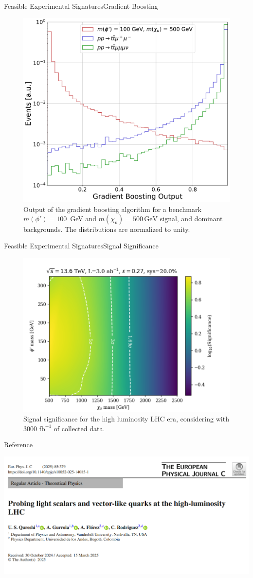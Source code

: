 \documentclass{../bredelebeamer}
\begin{document}
\begin{frame}{Feasible Experimental Signatures}{Gradient Boosting}
	\begin{figure}
	\centering
		\centering  \includegraphics[width=.6\linewidth]{XGB_output.pdf}
		\caption{Output of the gradient boosting algorithm for a benchmark $m(\phi') = 100$~\textrm{GeV} and $m(\chi_\mathrm{u}) = 500\, \mathrm{GeV}$ signal, and dominant backgrounds. The distributions are normalized to unity.}
		\label{fig:xgboostout}
	\end{figure}
\end{frame}

\begin{frame}{Feasible Experimental Signatures}{Signal Significance}
	\begin{figure}[]
		\centering
		\includegraphics[width=.6\linewidth]{significance.pdf}
		\caption{Signal significance for the high luminosity LHC era, considering with 3000  $\mathrm{fb}^{-1}$ of collected data.}
		\label{fig:/significance_3000}
	\end{figure}
\end{frame}


\begin{frame}{Reference}
	\begin{center}
		\includegraphics[width=.9\linewidth]{reference.png}
	\end{center}
\end{frame}
\end{document}
